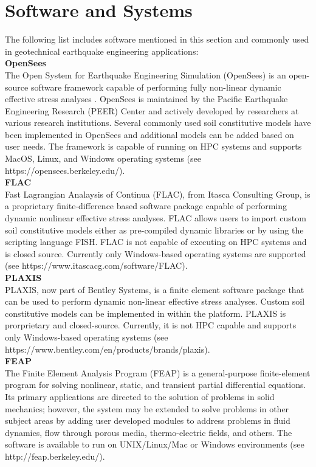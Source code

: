 \section{Software and Systems}
\label{sec:eq_landslide_tools}

The following list includes software mentioned in this section and commonly used in geotechnical earthquake engineering applications:\\

\noindent\textbf{OpenSees}\\
The Open System for Earthquake Engineering Simulation (OpenSees) is an open-source software framework capable of performing fully non-linear dynamic effective stress analyses \citep{McKenna11}. OpenSees is maintained by the Pacific Earthquake Engineering Research (PEER) Center and actively developed by researchers at various research institutions. Several commonly used soil constitutive models have been implemented in OpenSees and additional models can be added based on user needs. The framework is capable of running on HPC systems and supports MacOS, Linux, and Windows operating systems (see https://opensees.berkeley.edu/).\\

\noindent\textbf{FLAC}\\
Fast Lagrangian Analaysis of Continua (FLAC), from Itasca Consulting Group, is a proprietary finite-difference based software package capable of performing dynamic nonlinear effective stress analyses. FLAC allows users to import custom soil constitutive models either as pre-compiled dynamic libraries or by using the scripting language FISH. FLAC is not capable of executing on HPC systems and is closed source. Currently only Windows-based operating systems are supported (see https://www.itascacg.com/software/FLAC).\\

\noindent\textbf{PLAXIS}\\
PLAXIS, now part of Bentley Systems, is a finite element software package that can be used to perform dynamic non-linear effective stress analyses. Custom soil constitutive models can be implemented in within the platform. PLAXIS is prorprietary and closed-source. Currently, it is not HPC capable and supports only Windows-based operating systems (see https://www.bentley.com/en/products/brands/plaxis).\\

\noindent\textbf{FEAP} \\The Finite Element Analysis Program (FEAP) is a general-purpose finite-element program for solving nonlinear, static, and transient partial differential equations. Its primary applications are directed to the solution of problems in solid mechanics; however, the system may be extended to solve problems in other subject areas by adding user developed modules to address problems in fluid dynamics, flow through porous media, thermo-electric fields, and others. The software is available to run on UNIX/Linux/Mac or Windows environments (see http://feap.berkeley.edu/).\\

